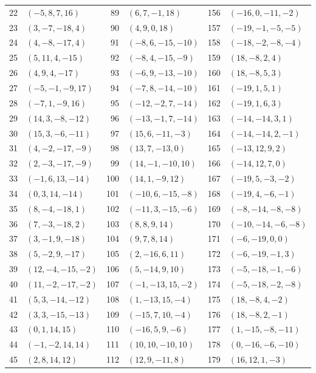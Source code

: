 {\begin{longtable}{rlrlrl}
22 & $(-5,8,7,16)$ & 89 & $(6,7,-1,18)$ & 156 & $(-16,0,-11,-2)$\\
23 & $(3,-7,-18,4)$ & 90 & $(4,9,0,18)$ & 157 & $(-19,-1,-5,-5)$\\
24 & $(4,-8,-17,4)$ & 91 & $(-8,6,-15,-10)$ & 158 & $(-18,-2,-8,-4)$\\
25 & $(5,11,4,-15)$ & 92 & $(-8,4,-15,-9)$ & 159 & $(18,-8,2,4)$\\
26 & $(4,9,4,-17)$ & 93 & $(-6,9,-13,-10)$ & 160 & $(18,-8,5,3)$\\
27 & $(-5,-1,-9,17)$ & 94 & $(-7,8,-14,-10)$ & 161 & $(-19,1,5,1)$\\
28 & $(-7,1,-9,16)$ & 95 & $(-12,-2,7,-14)$ & 162 & $(-19,1,6,3)$\\
29 & $(14,3,-8,-12)$ & 96 & $(-13,-1,7,-14)$ & 163 & $(-14,-14,3,1)$\\
30 & $(15,3,-6,-11)$ & 97 & $(15,6,-11,-3)$ & 164 & $(-14,-14,2,-1)$\\
31 & $(4,-2,-17,-9)$ & 98 & $(13,7,-13,0)$ & 165 & $(-13,12,9,2)$\\
32 & $(2,-3,-17,-9)$ & 99 & $(14,-1,-10,10)$ & 166 & $(-14,12,7,0)$\\
33 & $(-1,6,13,-14)$ & 100 & $(14,1,-9,12)$ & 167 & $(-19,5,-3,-2)$\\
34 & $(0,3,14,-14)$ & 101 & $(-10,6,-15,-8)$ & 168 & $(-19,4,-6,-1)$\\
35 & $(8,-4,-18,1)$ & 102 & $(-11,3,-15,-6)$ & 169 & $(-8,-14,-8,-8)$\\
36 & $(7,-3,-18,2)$ & 103 & $(8,8,9,14)$ & 170 & $(-10,-14,-6,-8)$\\
37 & $(3,-1,9,-18)$ & 104 & $(9,7,8,14)$ & 171 & $(-6,-19,0,0)$\\
38 & $(5,-2,9,-17)$ & 105 & $(2,-16,6,11)$ & 172 & $(-6,-19,-1,3)$\\
39 & $(12,-4,-15,-2)$ & 106 & $(5,-14,9,10)$ & 173 & $(-5,-18,-1,-6)$\\
40 & $(11,-2,-17,-2)$ & 107 & $(-1,-13,15,-2)$ & 174 & $(-5,-18,-2,-8)$\\
41 & $(5,3,-14,-12)$ & 108 & $(1,-13,15,-4)$ & 175 & $(18,-8,4,-2)$\\
42 & $(3,3,-15,-13)$ & 109 & $(-15,7,10,-4)$ & 176 & $(18,-8,2,-1)$\\
43 & $(0,1,14,15)$ & 110 & $(-16,5,9,-6)$ & 177 & $(1,-15,-8,-11)$\\
44 & $(-1,-2,14,14)$ & 111 & $(10,10,-10,10)$ & 178 & $(0,-16,-6,-10)$\\
45 & $(2,8,14,12)$ & 112 & $(12,9,-11,8)$ & 179 & $(16,12,1,-3)$\\

\end{longtable}}
